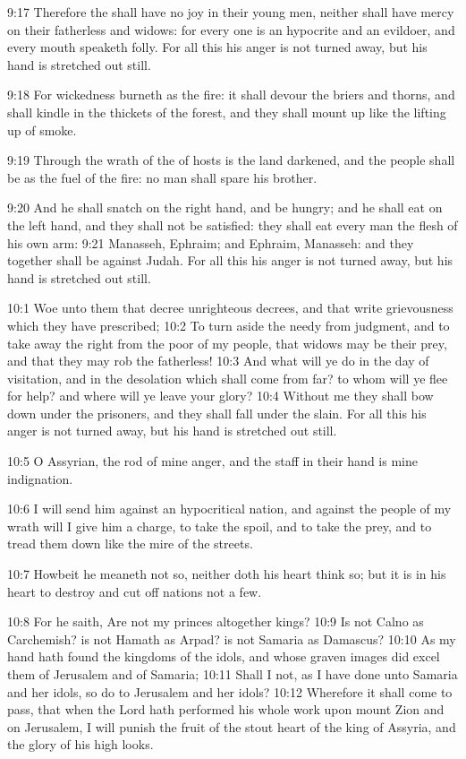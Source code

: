 9:17 Therefore the \LORD shall have no joy in their young men, neither shall have mercy on their fatherless and widows: for every one is an hypocrite and an evildoer, and every mouth speaketh folly. For all this his anger is not turned away, but his hand is stretched out still.

9:18 For wickedness burneth as the fire: it shall devour the briers and thorns, and shall kindle in the thickets of the forest, and they shall mount up like the lifting up of smoke.

9:19 Through the wrath of the \LORD of hosts is the land darkened, and the people shall be as the fuel of the fire: no man shall spare his brother.

9:20 And he shall snatch on the right hand, and be hungry; and he shall eat on the left hand, and they shall not be satisfied: they shall eat every man the flesh of his own arm: 9:21 Manasseh, Ephraim; and Ephraim, Manasseh: and they together shall be against Judah. For all this his anger is not turned away, but his hand is stretched out still.

10:1 Woe unto them that decree unrighteous decrees, and that write grievousness which they have prescribed; 10:2 To turn aside the needy from judgment, and to take away the right from the poor of my people, that widows may be their prey, and that they may rob the fatherless!  10:3 And what will ye do in the day of visitation, and in the desolation which shall come from far? to whom will ye flee for help?  and where will ye leave your glory?  10:4 Without me they shall bow down under the prisoners, and they shall fall under the slain. For all this his anger is not turned away, but his hand is stretched out still.

10:5 O Assyrian, the rod of mine anger, and the staff in their hand is mine indignation.

10:6 I will send him against an hypocritical nation, and against the people of my wrath will I give him a charge, to take the spoil, and to take the prey, and to tread them down like the mire of the streets.

10:7 Howbeit he meaneth not so, neither doth his heart think so; but it is in his heart to destroy and cut off nations not a few.

10:8 For he saith, Are not my princes altogether kings?  10:9 Is not Calno as Carchemish? is not Hamath as Arpad? is not Samaria as Damascus?  10:10 As my hand hath found the kingdoms of the idols, and whose graven images did excel them of Jerusalem and of Samaria; 10:11 Shall I not, as I have done unto Samaria and her idols, so do to Jerusalem and her idols?  10:12 Wherefore it shall come to pass, that when the Lord hath performed his whole work upon mount Zion and on Jerusalem, I will punish the fruit of the stout heart of the king of Assyria, and the glory of his high looks.

